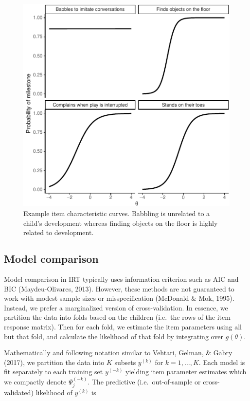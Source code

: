 \documentclass[10pt, letterpaper]{article}
\newenvironment{CodeChunk}{}{}
\begin{document}
\begin{CodeChunk}
\begin{figure}[tb]
\includegraphics{figs/icc-1} \caption[Example item characteristic curves]{Example item characteristic curves. Babbling is unrelated to a child's development whereas finding objects on the floor is highly related to development.}\label{fig:icc}
\end{figure}
\end{CodeChunk}

\hypertarget{modelcompare}{%
\subsection{Model comparison}\label{modelcompare}}

Model comparison in IRT typically uses information criterion such as AIC
and BIC (Maydeu-Olivares, 2013). However, these methods are not
guaranteed to work with modest sample sizes or misspecification
(McDonald \& Mok, 1995). Instead, we prefer a marginalized version of
cross-validation. In essence, we partition the data into folds based on
the children (i.e.~the rows of the item response matrix). Then for each
fold, we estimate the item parameters using all but that fold, and
calculate the likelihood of that fold by integrating over \(g(\theta)\).

Mathematically and following notation similar to Vehtari, Gelman, \&
Gabry (2017), we partition the data into \(K\) subsets \(y^{(k)}\) for
\(k = 1, \dots, K\). Each model is fit separately to each training set
\(y^{(-k)}\) yielding item parameter estimates which we compactly denote
\(\Psi_j^{(-k)}\). The predictive (i.e.~out-of-sample or
cross-validated) likelihood of \(y^{(k)}\) is
\end{document}
